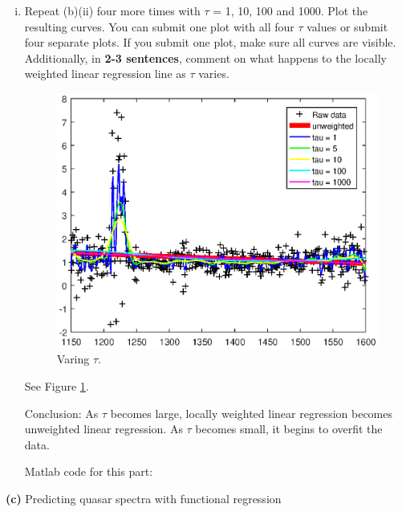 \documentclass[11pt]{article}
\renewcommand\part[1]{\vspace{.10in}\textbf{(#1)  }}
\begin{document}
\begin{enumerate}[i.]
See next part of Figure \ref{ps1q5pb23}.
  \item Repeat (b)(ii) four more times with $\tau$ = 1, 10, 100 and 1000. Plot the resulting curves. You can submit one plot with all four $\tau$ values or submit four separate plots. If you submit one plot, make sure all curves are visible. Additionally, in \textbf{2-3 sentences}, comment on what happens to the locally weighted linear regression line as $\tau$ varies.
\begin{figure}[htb]
  \centering
  \includegraphics{ps1q5pb23}
  \caption{Varing $\tau$.}\label{ps1q5pb23}
\end{figure}

See Figure \ref{ps1q5pb23}.

Conclusion: As $\tau$ becomes large, locally weighted linear regression becomes unweighted linear regression. As $\tau$ becomes small, it begins to overfit the data.

Matlab code for this part:



\end{enumerate}

\part{c}Predicting quasar spectra with functional regression
\end{document}
